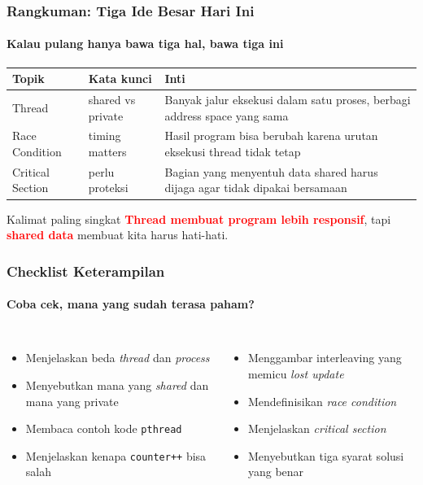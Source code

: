 \documentclass[t,aspectratio=169,xcolor=dvipsnames]{beamer}
\newcommand{\tem}[1]{\textbf{\textcolor{red}{#1}}}
\begin{document}
\begin{frame}
    \frametitle{Rangkuman: Tiga Ide Besar Hari Ini}
    \framesubtitle{Kalau pulang hanya bawa tiga hal, bawa tiga ini}
    \scriptsize

    \begin{tabular}{p{}p{}p{}}
        \toprule
        \textbf{Topik} & \textbf{Kata kunci} & \textbf{Inti} \\
        \midrule
        Thread & shared vs private & Banyak jalur eksekusi dalam satu proses, berbagi address space yang sama \\
        Race Condition & timing matters & Hasil program bisa berubah karena urutan eksekusi thread tidak tetap \\
        Critical Section & perlu proteksi & Bagian yang menyentuh data shared harus dijaga agar tidak dipakai bersamaan \\
        \bottomrule
    \end{tabular}

    \vspace{0.25cm}
    \begin{exampleblock}{Kalimat paling singkat}
        \tem{Thread membuat program lebih responsif}, tapi \tem{shared data} membuat kita harus hati-hati.
    \end{exampleblock}
\end{frame}

\begin{frame}
    \frametitle{Checklist Keterampilan}
    \framesubtitle{Coba cek, mana yang sudah terasa paham?}
    \small

    \begin{columns}[T]
        \begin{itemize}
            \item Menjelaskan beda \textit{thread} dan \textit{process}
            \item Menyebutkan mana yang \textit{shared} dan mana yang private
            \item Membaca contoh kode \texttt{pthread}
            \item Menjelaskan kenapa \texttt{counter++} bisa salah
        \end{itemize}

        \begin{itemize}
            \item Menggambar interleaving yang memicu \textit{lost update}
            \item Mendefinisikan \textit{race condition}
            \item Menjelaskan \textit{critical section}
            \item Menyebutkan tiga syarat solusi yang benar
        \end{itemize}
    \end{columns}
\end{frame}
\end{document}
